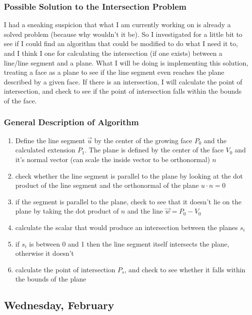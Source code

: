 \documentclass[letterpaper,oneside,titlepage]{article}
\begin{document}
\subsubsection{Possible Solution to the Intersection Problem}
I had a sneaking suspicion that what I am currently working on is already a solved problem (because why wouldn't it be).  So I investigated for a little bit to see if I could find an algorithm that could be modified to do what I need it to, and I think I one for calculating the intersection (if one exists) between a line/line segment and a plane.  What I will be doing is implementing this solution, treating a face as a plane to see if the line segment even reaches the plane described by a given face.  If there is an intersection, I will calculate the point of intersection, and check to see if the point of intersection falls within the bounds of the face.

\subsubsection{General Description of Algorithm}
\begin{enumerate}
\item Define the line segment $\vec{u}$ by the center of the growing face $P_0$ and the calculated extension $P_1$.  The plane is defined by the center of the face $V_0$ and it's normal vector (can scale the inside vector to be orthonormal) $n$
\item check whether the line segment is parallel to the plane by looking at the dot product of the line segment and the orthonormal of the plane $u \cdot n = 0$
\item if the segment is parallel to the plane, check to see that it doesn't lie on the plane by taking the dot product of $n$ and the line $\vec{w} = P_0 - V_0$
\item calculate the scalar that would produce an intersection between the planes $s_i$
\item if $s_i$ is between 0 and 1 then the line segment itself intersects the plane, otherwise it doesn't
\item calculate the point of intersection $P_s$, and check to see whether it falls within the bounds of the plane
\end{enumerate}

\subsection{Wednesday, February }
\end{document}
